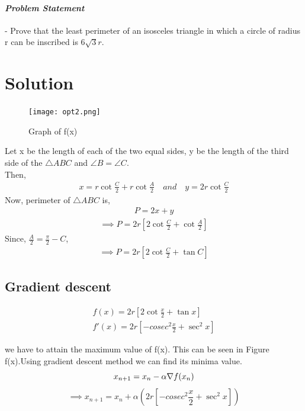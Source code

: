 \documentclass[10pt, a4paper]{article}
\title{\mytitle}
\author{\myauthor\hspace{1em}\\\contact\\IITH\hspace{0.5em}-\hspace{0.5em}\mymodule}
\date{}
\begin{document}
	\maketitle
\paragraph{\textit{Problem Statement}}- Prove that the least perimeter of an isosceles triangle in which a circle of radius r can be inscribed is $6\sqrt{3}r$.

\section*{\large Solution}
\begin{figure}[H]
\centering
\texttt{[image: opt2.png]}
\caption{Graph of f(x)}
\label{fig:triangle}
\end{figure}

Let x be the length of each of the two equal sides, y be the length of the third side of the $\triangle{ABC}$ and $\angle{B}=\angle{C}$.\\
Then,
\begin{align}
x=r\cot{\frac{C}{2}}+r\cot{\frac{A}{2}}\hspace{1em}and\hspace{1em}y=2r\cot{\frac{C}{2}}
\end{align}	
Now, perimeter of $\triangle{ABC}$ is,
\begin{align}
P=2x+y
\end{align}
\begin{align}
\implies P=2r[2\cot{\frac{C}{2}}+\cot{\frac{A}{2}}]
\end{align}
Since, $\frac{A}{2}=\frac{\pi}{2}-C$,
\begin{align}
\implies P=2r[2\cot{\frac{C}{2}}+\tan{C}]
\end{align}
    \subsection*{\normalsize Gradient descent}
    
    
    \begin{align}
	\label{eq:vol_varx}
	f(x) =2r[2\cot{\frac{x}{2}}+\tan{x}]\\
    f'(x) = 2r[-cosec^2{\frac{x}{2}}+\sec^2{x}]
	\end{align}

we have to attain the maximum value of f(x). This can be seen in Figure f(x).Using gradient descent method we can find its minima value.
\begin{equation}
        x_{n+1} = x_n - \alpha \nabla f(x_n) \\
\end{equation}
\vspace{1mm}
\begin{equation}
\implies x_{n+1}=x_n+\alpha(2r[-cosec^2{\frac{x}{2}}+\sec^2{x}])
\end{equation}
\end{document}

